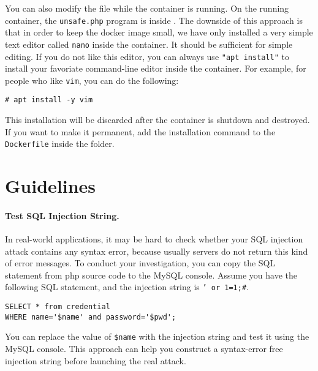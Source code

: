 You can also modify the file while the container is running.
On the running container, the \texttt{unsafe.php} program is 
inside . 
The downside of this
approach is that in order to keep the docker image small,
we have only installed a very simple text editor called \texttt{nano}
inside the container. It should be sufficient for simple editing.
If you do not like this editor, you can always use \texttt{"apt install"} to install
your favoriate command-line editor inside the container. For example,
for people who like \texttt{vim}, you can do the following:

\begin{lstlisting}
# apt install -y vim 
\end{lstlisting}

This installation will be discarded after the container is shutdown and destroyed.
If you want to make it permanent, add the installation command to the \texttt{Dockerfile} 
inside the  folder. 
 


\section{Guidelines}
\label{sec:guidelines}

\paragraph{Test SQL Injection String.}
In real-world applications, it may be hard to check whether your SQL injection attack contains
any syntax error, because usually servers do not return this kind of error messages. 
To conduct your investigation, you can copy the SQL statement from php source code to the MySQL console. 
Assume you have the following SQL statement, and the injection string is {\tt ' or 1=1;\#}. 

\begin{lstlisting}
SELECT * from credential 
WHERE name='$name' and password='$pwd';
\end{lstlisting}

You can replace the value of {\tt \$name} with the
injection string and test it using the MySQL console. 
This approach can help you construct a syntax-error 
free injection string before launching the real attack. 



